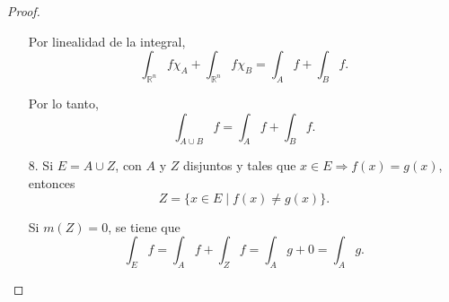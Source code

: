 \begin{proof}
\begin{enumerate}
              Por linealidad de la integral, $$ \int_{\mathbb{R}^n} f \chi_A +
                  \int_{\mathbb{R}^n} f \chi_B = \int_A f + \int_B f. $$

              Por lo tanto, $$ \int_{A \cup B} f = \int_A f + \int_B f. $$

        \item[8.] Si $E = A \cup Z$, con $A$ y $Z$ disjuntos y tales que $x \in E \Rightarrow f(x) = g(x)$, entonces
              $$
                  Z = \{ x \in E \mid f(x) \neq g(x) \}.
              $$

              Si $m(Z) = 0$, se tiene que $$ \int_E f = \int_A f + \int_Z f = \int_A g + 0 =
                  \int_A g. $$

    \end{enumerate}
\end{proof}

